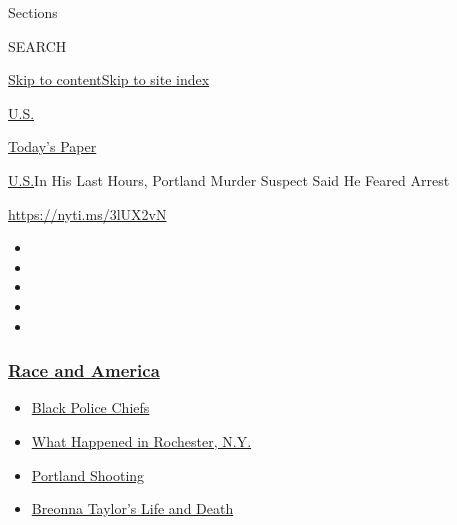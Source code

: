 Sections

SEARCH

\protect\hyperlink{site-content}{Skip to
content}\protect\hyperlink{site-index}{Skip to site index}

\href{https://www.nytimes3xbfgragh.onion/section/us}{U.S.}

\href{https://myaccount.nytimes3xbfgragh.onion/auth/login?response_type=cookie\&client_id=vi}{}

\href{https://www.nytimes3xbfgragh.onion/section/todayspaper}{Today's
Paper}

\href{/section/us}{U.S.}\textbar{}In His Last Hours, Portland Murder
Suspect Said He Feared Arrest

\url{https://nyti.ms/3lUX2vN}

\begin{itemize}
\item
\item
\item
\item
\item
\end{itemize}

\hypertarget{race-and-america}{%
\subsubsection{\texorpdfstring{\href{https://www.nytimes3xbfgragh.onion/news-event/george-floyd-protests-minneapolis-new-york-los-angeles?name=styln-george-floyd\&region=TOP_BANNER\&block=storyline_menu_recirc\&action=click\&pgtype=Article\&impression_id=6761aa90-f4c5-11ea-8618-eb506373a11e\&variant=undefined}{Race
and America}}{Race and America}}\label{race-and-america}}

\begin{itemize}
\tightlist
\item
  \href{https://www.nytimes3xbfgragh.onion/2020/09/11/us/black-police-chiefs-reform.html?name=styln-george-floyd\&region=TOP_BANNER\&block=storyline_menu_recirc\&action=click\&pgtype=Article\&impression_id=6761aa91-f4c5-11ea-8618-eb506373a11e\&variant=undefined}{Black
  Police Chiefs}
\item
  \href{https://www.nytimes3xbfgragh.onion/2020/09/04/nyregion/rochester-police-daniel-prude.html?name=styln-george-floyd\&region=TOP_BANNER\&block=storyline_menu_recirc\&action=click\&pgtype=Article\&impression_id=6761d1a0-f4c5-11ea-8618-eb506373a11e\&variant=undefined}{What
  Happened in Rochester, N.Y.}
\item
  \href{https://www.nytimes3xbfgragh.onion/2020/08/30/us/portland-shooting-explained.html?name=styln-george-floyd\&region=TOP_BANNER\&block=storyline_menu_recirc\&action=click\&pgtype=Article\&impression_id=6761d1a1-f4c5-11ea-8618-eb506373a11e\&variant=undefined}{Portland
  Shooting}
\item
  \href{https://www.nytimes3xbfgragh.onion/2020/08/30/us/breonna-taylor-police-killing.html?name=styln-george-floyd\&region=TOP_BANNER\&block=storyline_menu_recirc\&action=click\&pgtype=Article\&impression_id=6761d1a2-f4c5-11ea-8618-eb506373a11e\&variant=undefined}{Breonna
  Taylor's Life and Death}
\end{itemize}

